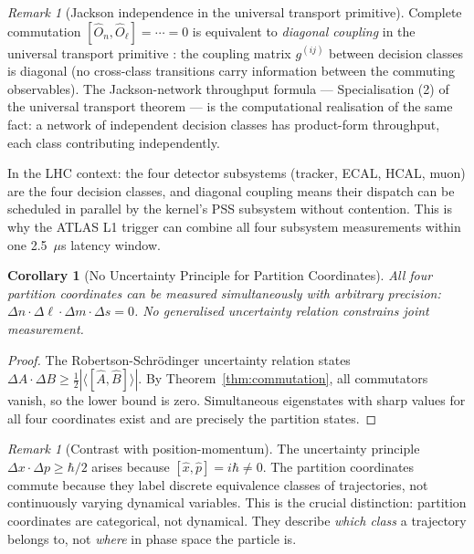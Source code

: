 \documentclass[twocolumn,10pt,a4paper]{article}
\theoremstyle{thmstyle}
\newtheorem{corollary}[theorem]{Corollary}
\theoremstyle{definition}
\theoremstyle{remark}
\newtheorem{remark}[theorem]{Remark}
\begin{document}
\begin{remark}[Jackson independence in the universal transport primitive]
Complete commutation $[\hat{O}_n, \hat{O}_\ell] = \cdots = 0$ is
equivalent to \emph{diagonal coupling} in the universal transport
primitive \citep{companion:transport}: the coupling matrix $g^{(ij)}$
between decision classes is diagonal (no cross-class transitions carry
information between the commuting observables).
The Jackson-network throughput formula — Specialisation (2) of the
universal transport theorem \citep{companion:transport} — is the
computational realisation of the same fact: a network of independent
decision classes has product-form throughput, each class contributing
independently.

In the LHC context: the four detector subsystems (tracker, ECAL, HCAL,
muon) are the four decision classes, and diagonal coupling means their
dispatch can be scheduled in parallel by the kernel's PSS subsystem
\citep{companion:kernel} without contention. This is why the ATLAS L1
trigger can combine all four subsystem measurements within one 2.5~$\mu$s
latency window.
\end{remark}

\begin{corollary}[No Uncertainty Principle for Partition Coordinates]
\label{cor:no_uncertainty}
All four partition coordinates can be measured simultaneously with
arbitrary precision:
$\Delta n \cdot \Delta\ell \cdot \Delta m \cdot \Delta s = 0$.
No generalised uncertainty relation constrains joint measurement.
\end{corollary}

\begin{proof}
The Robertson-Schrödinger uncertainty relation states
$\Delta A \cdot \Delta B \geq \tfrac{1}{2}|\langle[\hat{A},\hat{B}]\rangle|$.
By Theorem~\ref{thm:commutation}, all commutators vanish, so
the lower bound is zero. Simultaneous eigenstates with sharp values
for all four coordinates exist and are precisely the partition states.
\end{proof}

\begin{remark}[Contrast with position-momentum]
The uncertainty principle $\Delta x \cdot \Delta p \geq \hbar/2$ arises
because $[\hat{x}, \hat{p}] = i\hbar \neq 0$. The partition coordinates
commute because they label discrete equivalence classes of trajectories,
not continuously varying dynamical variables. This is the crucial
distinction: partition coordinates are categorical, not dynamical. They
describe \emph{which class} a trajectory belongs to, not \emph{where}
in phase space the particle is.
\end{remark}
\end{document}
